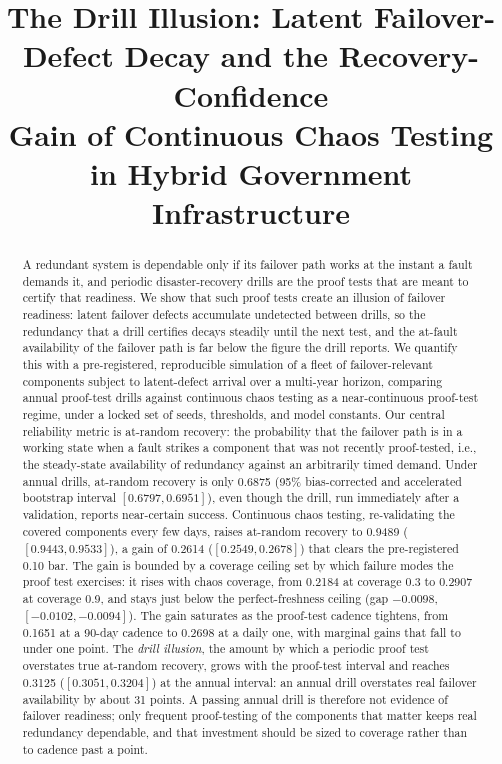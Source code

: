 \documentclass[journal]{IEEEtran}
\title{The Drill Illusion: Latent Failover-Defect Decay and the Recovery-Confidence\\
Gain of Continuous Chaos Testing in Hybrid Government Infrastructure}
\author{%
  \IEEEauthorblockN{Harshavardhan Malla}
  \IEEEauthorblockA{Independent Researcher\\ Email: harshavardhanmalla75@gmail.com}%
}
\begin{document}
\maketitle

\begin{abstract}
A redundant system is dependable only if its failover path works at the instant a fault demands it,
and periodic disaster-recovery drills are the proof tests that are meant to certify that readiness.
We show that such proof tests create an illusion of failover readiness: latent failover defects
accumulate undetected between drills, so the redundancy that a drill certifies decays steadily until
the next test, and the at-fault availability of the failover path is far below the figure the drill
reports. We quantify this with a pre-registered, reproducible simulation of a fleet of
failover-relevant components subject to latent-defect arrival over a multi-year horizon, comparing
annual proof-test drills against continuous chaos testing as a near-continuous proof-test regime,
under a locked set of seeds, thresholds, and model constants. Our central reliability metric is
at-random recovery: the probability that the failover path is in a working state when a fault strikes
a component that was not recently proof-tested, i.e., the steady-state availability of redundancy
against an arbitrarily timed demand. Under annual drills, at-random recovery is only 0.6875 (95\%
bias-corrected and accelerated bootstrap interval $[0.6797, 0.6951]$), even though the drill, run
immediately after a validation, reports near-certain success. Continuous chaos testing, re-validating
the covered components every few days, raises at-random recovery to 0.9489 ($[0.9443, 0.9533]$), a
gain of 0.2614 ($[0.2549, 0.2678]$) that clears the pre-registered 0.10 bar. The gain is bounded by a
coverage ceiling set by which failure modes the proof test exercises: it rises with chaos coverage,
from 0.2184 at coverage 0.3 to 0.2907 at coverage 0.9, and stays just below the perfect-freshness
ceiling (gap $-0.0098$, $[-0.0102, -0.0094]$). The gain saturates as the proof-test cadence tightens,
from 0.1651 at a 90-day cadence to 0.2698 at a daily one, with marginal gains that fall to under one
point. The \emph{drill illusion}, the amount by which a periodic proof test overstates true at-random
recovery, grows with the proof-test interval and reaches 0.3125 ($[0.3051, 0.3204]$) at the annual
interval: an annual drill overstates real failover availability by about 31 points. A passing annual
drill is therefore not evidence of failover readiness; only frequent proof-testing of the components
that matter keeps real redundancy dependable, and that investment should be sized to coverage rather
than to cadence past a point.
\end{abstract}
\end{document}
